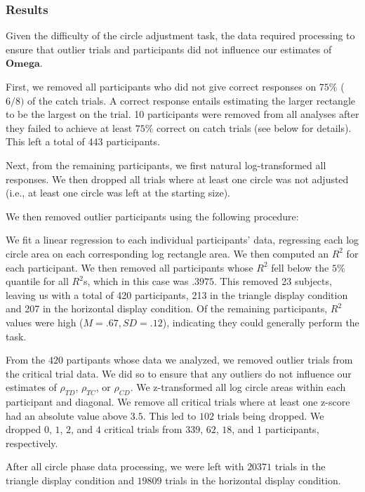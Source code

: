 \documentclass{umassthesis}          %
\begin{document}
\subsubsection{Results}
Given the difficulty of the circle adjustment task, the data required processing to ensure that outlier trials and participants did not influence our estimates of $\mathbf{Omega}$.

First, we removed all participants who did not give correct responses on $75\%$ ($6/8)$ of the catch trials. A correct response entails estimating the larger rectangle to be the largest on the trial. 10 participants were removed from all analyses after they failed to achieve at least $75\%$ correct on catch trials (see below for details). This left a total of 443 participants.

Next, from the remaining participants, we first natural log-transformed all responses. We then dropped all trials where at least one circle was not adjusted (i.e., at least one circle was left at the starting size).

We then removed outlier participants using the following procedure:

We fit a linear regression to each individual participants' data, regressing each log circle area on each corresponding log rectangle area. We then computed an $R^2$ for each participant. We then removed all participants whose $R^2$ fell below the $5\%$ quantile for all $R^2$s, which in this case was $.3975$. This removed 23 subjects, leaving us with a total of 420 participants, 213 in the triangle display condition and 207 in the horizontal display condition. Of the remaining participants, $R^2$ values were high ($M=.67,SD=.12$), indicating they could generally perform the task.

From the $420$ partipants whose data we analyzed, we removed outlier trials from the critical trial data. We did so to ensure that any outliers do not influence our estimates of $\rho_{TD}$, $\rho_{TC}$, or $\rho_{CD}$. We z-transformed all log circle areas within each participant and diagonal. We remove all critical trials where at least one z-score had an absolute value above $3.5$. This led to $102$ trials being dropped. We dropped $0$, $1$, $2$, and $4$ critical trials from $339$, $62$, $18$, and $1$ participants, respectively. 

After all circle phase data processing, we were left with $20371$ trials in the triangle display condition and $19809$ trials in the horizontal display condition. 
\end{document}
